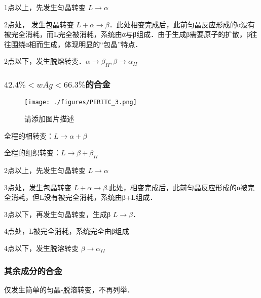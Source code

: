 1点以上，先发生匀晶转变 $L \rightarrow \alpha$

2点处， 发生包晶转变 $L+ \alpha \rightarrow \beta$．此处相变完成后，此前匀晶反应形成的α没有被完全消耗，而L完全被消耗，系统由α与β组成．由于生成β需要原子的扩散，β往往围绕α相而生成，体现明显的“包晶”特点．

2点以下，发生脱熔转变．$\alpha \rightarrow \beta_{II}, \beta \rightarrow \alpha_{II}$

\subsubsection{$42.4\%<wAg<66.3\%$的合金}
\begin{figure}[ht]
\centering
\texttt{[image: ./figures/PERITC\_3.png]}
\caption{请添加图片描述} \label{PERITC_fig3}
\end{figure}
全程的相转变：$L \rightarrow \alpha+\beta$

全程的组织转变：$L \rightarrow \beta + \beta_{II}$

2点以上，先发生匀晶转变 $L \rightarrow \alpha$

3点处，发生包晶转变 $L + \alpha \rightarrow \beta$.此处，相变完成后，此前匀晶反应形成的α被完全消耗，但L没有被完全消耗，系统由β+L组成．

3点以下，再发生匀晶转变，生成β $L \rightarrow \beta$．

4点处，L被完全消耗，系统完全由β组成

4点以下，发生脱溶转变 $\beta \rightarrow \alpha_{II}$

\subsubsection{其余成分的合金}
仅发生简单的匀晶-脱溶转变，不再列举．

